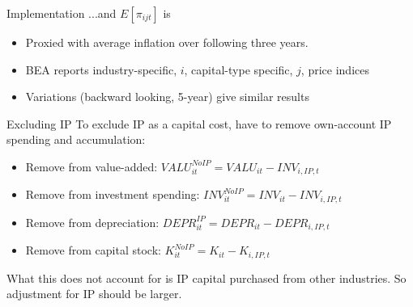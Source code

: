 \documentclass[10pt,xcolor=dvipsnames]{beamer}
\begin{document}
\begin{frame}{Implementation}
...and $E[\pi_{ijt}]$ is
\begin{itemize}
  \item Proxied with average inflation over following three years.
  \item BEA reports industry-specific, $i$, capital-type specific, $j$, price indices
  \item Variations (backward looking, 5-year) give similar results
\end{itemize}

\vspace{.25in} \hfill \hyperlink{Susercost}{}
\end{frame}

\begin{frame}{Excluding IP}\label{Aip}
To exclude IP as a capital cost, have to remove own-account IP spending and accumulation:
\begin{itemize}
  \item Remove from value-added: $VALU_{it}^{NoIP} = VALU_{it} - INV_{i,IP,t}$
  \item Remove from investment spending: $INV_{it}^{NoIP} = INV_{it} - INV_{i,IP,t}$
  \item Remove from depreciation: $DEPR_{it}^{IP} = DEPR_{it} - DEPR_{i,IP,t}$
  \item Remove from capital stock: $K^{NoIP}_{it} = K_{it} - K_{i,IP,t}$
\end{itemize}
What this does not account for is IP capital purchased from other industries. So adjustment for IP should be larger. 

\vspace{.25in} \hfill \hyperlink{Aip}{}
\end{frame}
\end{document}
